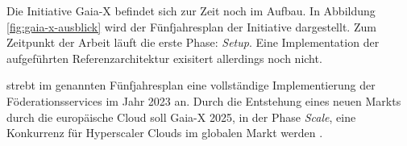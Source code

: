 Die Initiative Gaia-X befindet sich zur Zeit noch im Aufbau.
In Abbildung \ref{fig:gaia-x-ausblick} wird der Fünfjahresplan der Initiative dargestellt.
Zum Zeitpunkt der Arbeit läuft die erste Phase: \emph{Setup}.
Eine Implementation der aufgeführten Referenzarchitektur exisitert allerdings noch nicht.

\citeauthor{Bonfiglio2021} strebt im genannten Fünfjahresplan eine vollständige Implementierung der Föderationsservices
im Jahr 2023 an.
Durch die Entstehung eines neuen Markts durch die europäische Cloud soll Gaia-X 2025, in der Phase \emph{Scale},
eine Konkurrenz für Hyperscaler Clouds im globalen Markt werden \cite{Bonfiglio2021}.